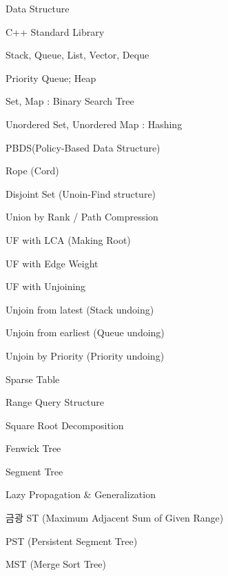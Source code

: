 \documentclass[portrait, 8pt, a4paper, oneside, twocolumn]{extarticle}
\begin{document}
\begin{tcolorbox}[breakable, enhanced, sharp corners, colback=white, colframe=black, boxrule=1pt, left=0pt]
\begin{IdeaNote}
\item Data Structure
    \begin{IdeaNote}
    \item C++ Standard Library
        \begin{IdeaNote}
        \item Stack, Queue, List, Vector, Deque
        \item Priority Queue; Heap
        \item Set, Map : Binary Search Tree
        \item Unordered Set, Unordered Map : Hashing
        \item PBDS(Policy-Based Data Structure)
        \item Rope (Cord)
        \end{IdeaNote}
    \item Disjoint Set (Unoin-Find structure)
        \begin{IdeaNote}
        \item Union by Rank / Path Compression
        \item UF with LCA (Making Root)
        \item UF with Edge Weight
        \item UF with Unjoining
            \begin{IdeaNote}
            \item Unjoin from latest (Stack undoing)
            \item Unjoin from earliest (Queue undoing)
            \item Unjoin by Priority (Priority undoing)
            \end{IdeaNote}
        \end{IdeaNote}
    \item Sparse Table
    \item Range Query Structure
        \begin{IdeaNote}
        \item Square Root Decomposition
        \item Fenwick Tree
        \item Segment Tree
            \begin{IdeaNote}
            \item Lazy Propagation \& Generalization
            \item 금광 ST (Maximum Adjacent Sum of Given Range)
            \item PST (Persistent Segment Tree)
            \item MST (Merge Sort Tree)

\end{IdeaNote}
\end{IdeaNote}
\end{IdeaNote}
\end{IdeaNote}
\end{tcolorbox}
\end{document}
